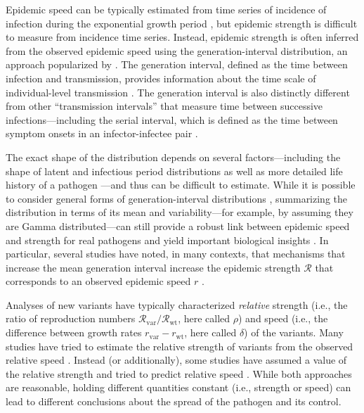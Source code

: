 \documentclass[12pt]{article}
\newcommand{\vvvar}{\mathrm{var}}
\newcommand{\wwwt}{\mathrm{wt}}
\newcommand{\rx}[1]{\ensuremath{{r}_{#1}}\xspace}
\newcommand{\rw}{\rx{\wwwt}}
\newcommand{\rv}{\rx{\vvvar}}
\newcommand{\Rx}[1]{\ensuremath{{\mathcal R}_{#1}}\xspace}
\newcommand{\RR}{\ensuremath{{\mathcal R}}\xspace}
\newcommand{\Rw}{\Rx{\wwwt}}
\newcommand{\Rv}{\Rx{\vvvar}}
\begin{document}
Epidemic speed can be typically estimated from time series of incidence of infection during the exponential growth period \citep{mills2004transmissibility,nishiura2009transmission,ma2014estimating}, but epidemic strength is difficult to measure from incidence time series.
Instead, epidemic strength is often inferred from the observed epidemic speed using the generation-interval distribution, an approach popularized by \citep{wallinga2007generation}.
The generation interval, defined as the time between infection and transmission, provides information about the time scale of individual-level transmission \citep{svensson2007note}.
The generation interval is also distinctly different from other ``transmission intervals'' that measure time between successive infections---including the serial interval, which is defined as the time between symptom onsets in an infector-infectee pair \citep{fine2003interval,grassly2008mathematical,britton2019estimation,ali2020serial,park2021forward}.

The exact shape of the distribution depends on several factors---including the shape of latent and infectious period distributions \citep{lloyd2001realistic,wearing2005appropriate,roberts2007model} as well as more detailed life history of a pathogen \citep{huber2016quantitative}---and thus can be difficult to estimate.
While it is possible to consider general forms of generation-interval distributions \citep{miller2010epidemics,svensson2015influence}, summarizing the distribution in terms of its mean and variability---for example, by assuming they are Gamma distributed---can still provide a robust link between epidemic speed and strength for real pathogens and yield important biological insights \citep{park2019practical}.
In particular, several studies have noted, in many contexts, that mechanisms that increase the mean generation interval increase the epidemic strength $\RR$ that corresponds to an observed epidemic speed $r$ \citep{eaton2014proportion,powers2014impact,weitz2015modeling,park2020time}.

Analyses of new variants have typically characterized \emph{relative} strength (i.e., the ratio of reproduction numbers $\Rv/\Rw$, here called $\rho$) and speed (i.e., the difference between growth rates $\rv-\rw$, here called $\delta$) of the variants.
Many studies have tried to estimate the relative strength of variants from the observed relative speed \citep{davies2021estimated, leung2021early, volz2021transmission,zhao2021,campbell2021increased}.
Instead (or additionally), some studies have assumed a value of the relative strength and tried to predict relative speed \citep{davies2021estimated,di2021impact}.
While both approaches are reasonable, holding different quantities constant (i.e., strength or speed) can lead to different conclusions about the spread of the pathogen and its control\citep{doi:10.1098/rspb.2020.1556}.
\end{document}
